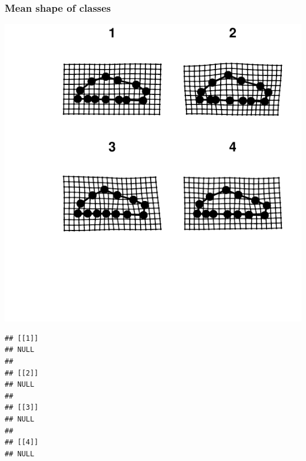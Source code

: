 \documentclass{beamer}\usepackage{graphicx, color}
\makeatletter
\def\maxwidth{ %
  \ifdim\Gin@nat@width>\linewidth
    \linewidth
  \else
    \Gin@nat@width
  \fi
}
\newenvironment{kframe}{%
 \def\at@end@of@kframe{}%
 \ifinner\ifhmode%
  \def\at@end@of@kframe{\end{minipage}}%
  \begin{minipage}{\columnwidth}%
 \fi\fi%
 \def\FrameCommand##1{\hskip\@totalleftmargin \hskip-\fboxsep
 \colorbox{shadecolor}{##1}\hskip-\fboxsep
     \hskip-\linewidth \hskip-\@totalleftmargin \hskip\columnwidth}%
 \MakeFramed {\advance\hsize-\width
   \@totalleftmargin\z@ \linewidth\hsize
   \@setminipage}}%
 {\par\unskip\endMakeFramed%
 \at@end@of@kframe}
\newenvironment{knitrout}{}{} %
\makeatother
\begin{document}
\begin{frame}[fragile]
  \frametitle{Mean shape of classes}

\begin{knitrout}
\color{fgcolor}
\includegraphics[width=\maxwidth]{figure/unnamed-chunk-6} 
\begin{kframe}\begin{verbatim}
## [[1]]
## NULL
## 
## [[2]]
## NULL
## 
## [[3]]
## NULL
## 
## [[4]]
## NULL
\end{verbatim}
\end{kframe}
\end{knitrout}


\end{frame}
\end{document}
